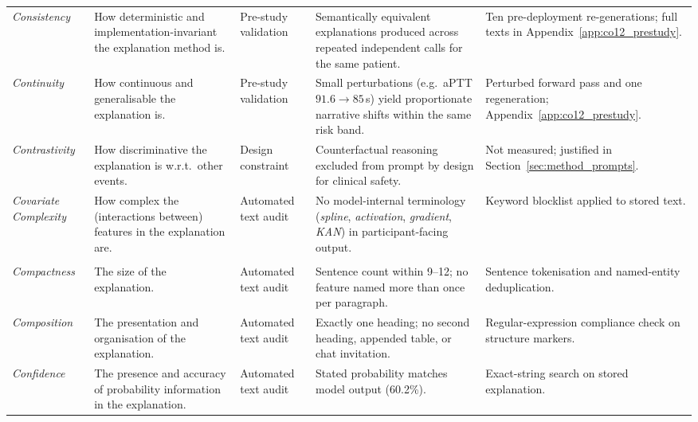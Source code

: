 \documentclass[12pt, a4paper]{article}
\begin{document}
\begin{longtable}{@{}>{\raggedright\arraybackslash}p{1.9cm}>{\raggedright\arraybackslash}p{4.0cm}>{\raggedright\arraybackslash}p{2.0cm}>{\raggedright\arraybackslash}p{3.5cm}>{\raggedright\arraybackslash}p{3.2cm}@{}}
\textit{Consistency} &
  How deterministic and implementation-invariant the explanation
  method is. &
  Pre-study validation &
  Semantically equivalent explanations produced across repeated
  independent calls for the same patient. &
  Ten pre-deployment re-generations; full texts in
  Appendix~\ref{app:co12_prestudy}. \\[6pt]

\textit{Continuity} &
  How continuous and generalisable the explanation is. &
  Pre-study validation &
  Small perturbations (e.g.\ aPTT $91.6\!\to\!85$\,s) yield proportionate
  narrative shifts within the same risk band. &
  Perturbed forward pass and one regeneration;
  Appendix~\ref{app:co12_prestudy}. \\[6pt]

\textit{Contrastivity} &
  How discriminative the explanation is w.r.t.\ other events. &
  Design constraint &
  Counterfactual reasoning excluded from prompt by design for
  clinical safety. &
  Not measured; justified in Section~\ref{sec:method_prompts}. \\[6pt]

\textit{Covariate Complexity} &
  How complex the (interactions between) features in the explanation
  are. &
  Automated text audit &
  No model-internal terminology (\emph{spline}, \emph{activation},
  \emph{gradient}, \emph{KAN}) in participant-facing output. &
  Keyword blocklist applied to stored text. \\

\midrule
\addlinespace[3pt]
\multicolumn{5}{@{}l@{}}{\textit{Presentation} --- structure and format of the explanation.}\\[4pt]

\textit{Compactness} &
  The size of the explanation. &
  Automated text audit &
  Sentence count within 9--12; no feature named more than once per
  paragraph. &
  Sentence tokenisation and named-entity deduplication. \\[6pt]

\textit{Composition} &
  The presentation and organisation of the explanation. &
  Automated text audit &
  Exactly one heading; no second heading, appended table, or chat
  invitation. &
  Regular-expression compliance check on structure markers. \\[6pt]

\textit{Confidence} &
  The presence and accuracy of probability information in the
  explanation. &
  Automated text audit &
  Stated probability matches model output (60.2\%). &
  Exact-string search on stored explanation. \\


\end{longtable}
\end{document}
